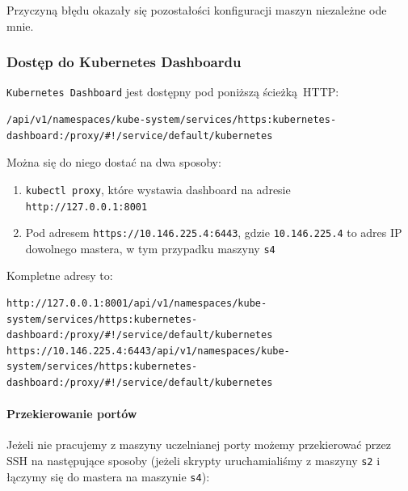 \documentclass[a4paper,12pt,twoside,openany]{report}
\providecommand{\tightlist}{%
  \setlength{\itemsep}{0pt}\setlength{\parskip}{0pt}}
\newcommand{\passthrough}[1]{#1}
\begin{document}
Przyczyną błędu okazały się pozostałości konfiguracji maszyn niezależne
ode mnie.

\hypertarget{dostux119p-do-kubernetes-dashboardu}{%
\subsubsection{Dostęp do Kubernetes
Dashboardu}\label{dostux119p-do-kubernetes-dashboardu}}

\passthrough{\lstinline!Kubernetes Dashboard!} jest dostępny pod
poniższą ścieżką~HTTP:

\begin{lstlisting}
/api/v1/namespaces/kube-system/services/https:kubernetes-dashboard:/proxy/#!/service/default/kubernetes
\end{lstlisting}

Można się do niego dostać na dwa sposoby:

\begin{enumerate}
\def\labelenumi{\arabic{enumi}.}
\tightlist
\item
  \passthrough{\lstinline!kubectl proxy!}, które wystawia dashboard na
  adresie \passthrough{\lstinline!http://127.0.0.1:8001!}
\item
  Pod adresem \passthrough{\lstinline!https://10.146.225.4:6443!}, gdzie
  \passthrough{\lstinline!10.146.225.4!} to adres IP dowolnego mastera,
  w tym przypadku maszyny \passthrough{\lstinline!s4!}
\end{enumerate}

Kompletne adresy to:

\begin{lstlisting}
http://127.0.0.1:8001/api/v1/namespaces/kube-system/services/https:kubernetes-dashboard:/proxy/#!/service/default/kubernetes
https://10.146.225.4:6443/api/v1/namespaces/kube-system/services/https:kubernetes-dashboard:/proxy/#!/service/default/kubernetes
\end{lstlisting}

\hypertarget{przekierowanie-portuxf3w}{%
\paragraph{Przekierowanie portów}\label{przekierowanie-portuxf3w}}

Jeżeli nie pracujemy z maszyny uczelnianej porty możemy przekierować
przez SSH na następujące sposoby (jeżeli skrypty uruchamialiśmy z
maszyny \passthrough{\lstinline!s2!} i łączymy się do mastera na
maszynie \passthrough{\lstinline!s4!}):
\end{document}

